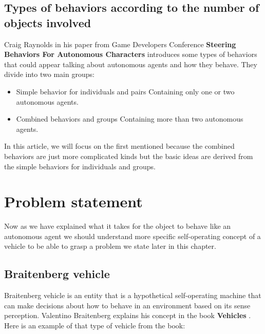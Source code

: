 \documentclass[10pt,twoside,english,a4paper]{article}
\begin{document}
\subsection{Types of behaviors according to the number of objects 
involved} \label{types of behaviors}

Craig Raynolds in his paper from Game Developers Conference 
\textbf{Steering Behaviors For Autonomous Characters} \cite{Raynolds} 
introduces some types of behaviors that could appear talking about 
autonomous agents and how they behave. They divide into two main 
groups:

\begin{itemize}

\item Simple behavior for individuals and pairs\newline
Containing only one or two autonomous agents.

\item Combined behaviors and groups\newline
Containing more than two autonomous agents.

\end{itemize}

In this article, we will focus on the first mentioned because 
the combined behaviors are just more complicated kinds but 
the basic ideas are derived from the simple behaviors for 
individuals and groups. 

\section{Problem statement} \label{problem}

Now as we have explained what it takes for the object to behave like 
an autonomous agent we should understand more specific self-operating
concept of a vehicle to be able to grasp a problem we state later 
in this chapter.

\subsection{Braitenberg vehicle} \label{braitenberg}

Braitenberg vehicle is an entity that is a hypothetical self-operating
machine that can make decisions about how to behave in an environment
based on its sense perception. Valentino Braitenberg explains his 
concept in the book \textbf{Vehicles} \cite{Braitenberg}. Here is 
an example of that type of vehicle from the book:
\end{document}
